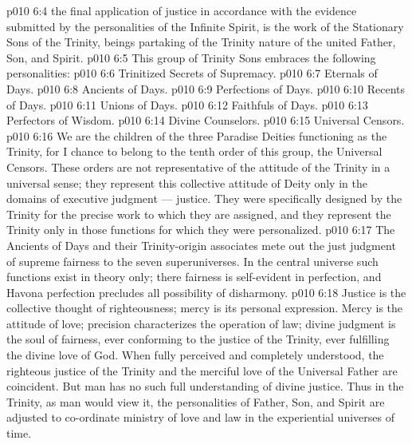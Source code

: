\vs p010 6:4 \pc {} the final application of justice in accordance with the evidence submitted by the personalities of the Infinite Spirit, is the work of the Stationary Sons of the Trinity, beings partaking of the Trinity nature of the united Father, Son, and Spirit.
\vs p010 6:5 \pc This group of Trinity Sons embraces the following personalities:
\vs p010 6:6 \bibnobreakspace Trinitized Secrets of Supremacy.
\vs p010 6:7 \bibnobreakspace Eternals of Days.
\vs p010 6:8 \bibnobreakspace Ancients of Days.
\vs p010 6:9 \bibnobreakspace Perfections of Days.
\vs p010 6:10 \bibnobreakspace Recents of Days.
\vs p010 6:11 \bibnobreakspace Unions of Days.
\vs p010 6:12 \bibnobreakspace Faithfuls of Days.
\vs p010 6:13 \bibnobreakspace Perfectors of Wisdom.
\vs p010 6:14 \bibnobreakspace Divine Counselors.
\vs p010 6:15 \bibnobreakspace Universal Censors.
\vs p010 6:16 \pc We are the children of the three Paradise Deities functioning as the Trinity, for I chance to belong to the tenth order of this group, the Universal Censors. These orders are not representative of the attitude of the Trinity in a universal sense; they represent this collective attitude of Deity only in the domains of executive judgment --- justice. They were specifically designed by the Trinity for the precise work to which they are assigned, and they represent the Trinity only in those functions for which they were personalized.
\vs p010 6:17 The Ancients of Days and their Trinity\hyp{}origin associates mete out the just judgment of supreme fairness to the seven superuniverses. In the central universe such functions exist in theory only; there fairness is self\hyp{}evident in perfection, and Havona perfection precludes all possibility of disharmony.
\vs p010 6:18 Justice is the collective thought of righteousness; mercy is its personal expression. Mercy is the attitude of love; precision characterizes the operation of law; divine judgment is the soul of fairness, ever conforming to the justice of the Trinity, ever fulfilling the divine love of God. When fully perceived and completely understood, the righteous justice of the Trinity and the merciful love of the Universal Father are coincident. But man has no such full understanding of divine justice. Thus in the Trinity, as man would view it, the personalities of Father, Son, and Spirit are adjusted to co\hyp{}ordinate ministry of love and law in the experiential universes of time.

